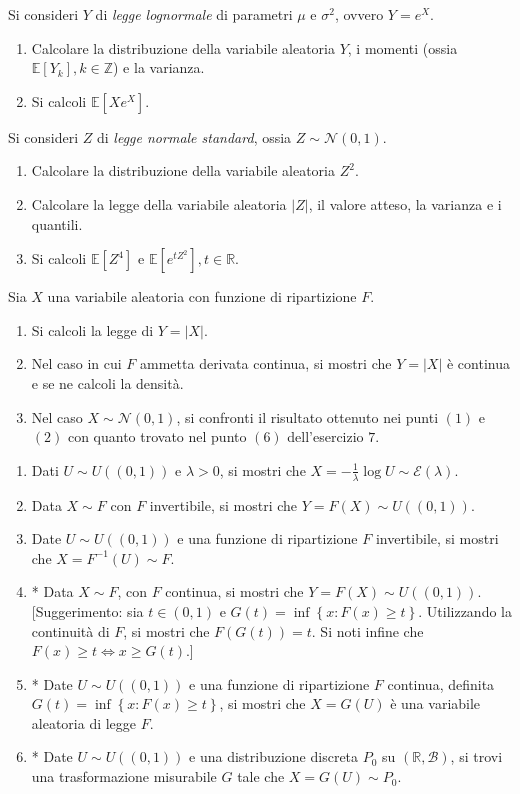 Si consideri $Y$ di \textit{legge lognormale} di parametri $\mu $ e $\sigma ^{2}$, ovvero $Y=e^{X}$.
\begin{enumerate}
\item Calcolare la distribuzione della variabile aleatoria $Y$, i momenti (ossia $\mathbb{E}[ Y_{k}] ,k\in \mathbb{Z}$) e la varianza.
\item Si calcoli $\mathbb{E}\left[ Xe^{X}\right]$.
\end{enumerate}

Si consideri $Z$ di \textit{legge normale standard}, ossia $Z\sim \mathcal{N}( 0,1)$.
\begin{enumerate}
\item Calcolare la distribuzione della variabile aleatoria $Z^{2}$.
\item Calcolare la legge della variabile aleatoria $| Z| $, il valore atteso, la varianza e i quantili.
\item Si calcoli $\mathbb{E}\left[ Z^{4}\right]$ e $\mathbb{E}\left[ e^{tZ^{2}}\right] ,t\in \mathbb{R}$.
\end{enumerate}
\Esercizio{}

Sia $X$ una variabile aleatoria con funzione di ripartizione $F$.
\begin{enumerate}
\item Si calcoli la legge di $Y=| X| $.
\item Nel caso in cui $F$ ammetta derivata continua, si mostri che $Y=| X| $ è continua e se ne calcoli la densità.
\item Nel caso $X\sim \mathcal{N}( 0,1)$, si confronti il risultato ottenuto nei punti $( 1)$ e $( 2)$ con quanto trovato nel punto $( 6)$ dell'esercizio $7$.
\end{enumerate}
\Esercizio{}
\begin{enumerate}
\item Dati $U\sim U(( 0,1))$ e $\lambda  >0$, si mostri che $X=-\frac{1}{\lambda }\log U\sim \mathcal{E}( \lambda )$.
\item Data $X\sim F$ con $F$ invertibile, si mostri che $Y=F( X) \sim U(( 0,1))$.
\item Date $U\sim U(( 0,1))$ e una funzione di ripartizione $F$ invertibile, si mostri che $X=F^{-1}( U) \sim F$.
\item * Data $X\sim F$, con $F$ continua, si mostri che $Y=F( X) \sim U(( 0,1))$. [Suggerimento: sia $t\in \left( 0,1\right)$ e $G\left( t\right) =\inf\left\{x:F\left( x\right) \geq t\right\}$. Utilizzando la continuità di $F$, si mostri che $F\left( G\left( t\right)\right) =t$. Si noti infine che $F\left( x\right) \geq t\iff x\geq G\left( t\right)$.]
\item * Date $U\sim U\left(\left( 0,1\right)\right)$ e una funzione di ripartizione $F$ continua, definita $G\left( t\right) =\inf\left\{x:F\left( x\right) \geq t\right\}$, si mostri che $X=G\left( U\right)$ è una variabile aleatoria di legge $F$.
\item * Date $U\sim U(( 0,1))$ e una distribuzione discreta $P_{0}$ su $\left(\mathbb{R} ,\mathcal{B}\right)$, si trovi una trasformazione misurabile $G$ tale che $X=G\left( U\right) \sim P_{0}$.
\end{enumerate}

